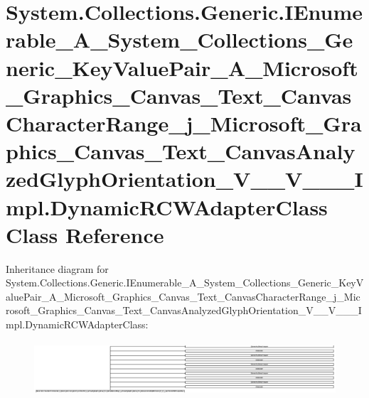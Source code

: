 \hypertarget{class_system_1_1_collections_1_1_generic_1_1_i_enumerable___a___system___collections___generic__59ba9827001d0862b7d2212c6aab9ff2}{}\section{System.\+Collections.\+Generic.\+I\+Enumerable\+\_\+\+A\+\_\+\+System\+\_\+\+Collections\+\_\+\+Generic\+\_\+\+Key\+Value\+Pair\+\_\+\+A\+\_\+\+Microsoft\+\_\+\+Graphics\+\_\+\+Canvas\+\_\+\+Text\+\_\+\+Canvas\+Character\+Range\+\_\+j\+\_\+\+Microsoft\+\_\+\+Graphics\+\_\+\+Canvas\+\_\+\+Text\+\_\+\+Canvas\+Analyzed\+Glyph\+Orientation\+\_\+\+V\+\_\+\+\_\+\+V\+\_\+\+\_\+\+\_\+\+Impl.\+Dynamic\+R\+C\+W\+Adapter\+Class Class Reference}
\label{class_system_1_1_collections_1_1_generic_1_1_i_enumerable___a___system___collections___generic__59ba9827001d0862b7d2212c6aab9ff2}
Inheritance diagram for System.\+Collections.\+Generic.\+I\+Enumerable\+\_\+\+A\+\_\+\+System\+\_\+\+Collections\+\_\+\+Generic\+\_\+\+Key\+Value\+Pair\+\_\+\+A\+\_\+\+Microsoft\+\_\+\+Graphics\+\_\+\+Canvas\+\_\+\+Text\+\_\+\+Canvas\+Character\+Range\+\_\+j\+\_\+\+Microsoft\+\_\+\+Graphics\+\_\+\+Canvas\+\_\+\+Text\+\_\+\+Canvas\+Analyzed\+Glyph\+Orientation\+\_\+\+V\+\_\+\+\_\+\+V\+\_\+\+\_\+\+\_\+\+Impl.\+Dynamic\+R\+C\+W\+Adapter\+Class\+:\begin{figure}[H]
\begin{center}
\leavevmode
\includegraphics[height=2.026316cm]{class_system_1_1_collections_1_1_generic_1_1_i_enumerable___a___system___collections___generic__59ba9827001d0862b7d2212c6aab9ff2}
\end{center}
\end{figure}
